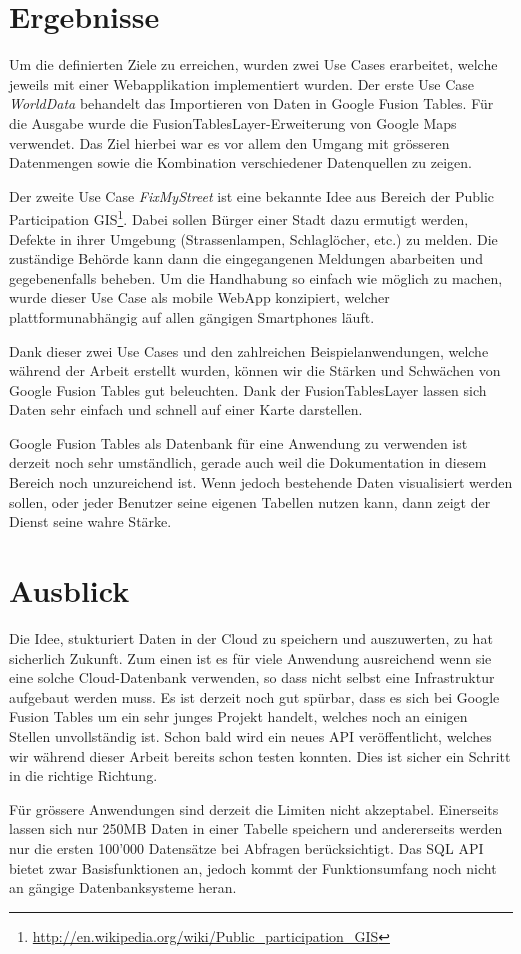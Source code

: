 \section*{Ergebnisse}
Um die definierten Ziele zu erreichen, wurden zwei Use Cases erarbeitet, welche jeweils mit einer Webapplikation implementiert wurden. Der erste Use Case \emph{WorldData} behandelt das Importieren von Daten in Google Fusion Tables. Für die Ausgabe wurde die FusionTablesLayer-Erweiterung von Google Maps verwendet. Das Ziel hierbei war es vor allem den Umgang mit grösseren Datenmengen sowie  die Kombination verschiedener Datenquellen zu zeigen.

Der zweite Use Case \emph{FixMyStreet} ist eine bekannte Idee aus Bereich der Public Participation \gls{GIS}\footnote{\url{http://en.wikipedia.org/wiki/Public_participation_GIS}}. Dabei sollen Bürger einer Stadt dazu ermutigt werden, Defekte in ihrer Umgebung (Strassenlampen, Schlaglöcher, etc.) zu melden. Die zuständige Behörde kann dann die eingegangenen Meldungen abarbeiten und gegebenenfalls beheben. Um die Handhabung so einfach wie möglich zu machen, wurde dieser Use Case als mobile WebApp konzipiert, welcher plattformunabhängig auf allen gängigen Smartphones läuft.

Dank dieser zwei Use Cases und den zahlreichen Beispielanwendungen, welche während der Arbeit erstellt wurden, können wir die Stärken und Schwächen von Google Fusion Tables gut beleuchten. Dank der FusionTablesLayer lassen sich Daten sehr einfach und schnell auf einer Karte darstellen.

Google Fusion Tables als Datenbank für eine Anwendung zu verwenden ist derzeit noch sehr umständlich, gerade auch weil die Dokumentation in diesem Bereich noch unzureichend ist. Wenn jedoch bestehende Daten visualisiert werden sollen, oder jeder Benutzer seine eigenen Tabellen nutzen kann, dann zeigt der Dienst seine wahre Stärke.

\section*{Ausblick}
Die Idee, stukturiert Daten in der \gls{Cloud} zu speichern und auszuwerten, zu hat sicherlich Zukunft. Zum einen ist es für viele Anwendung ausreichend wenn sie eine solche \gls{Cloud}-Datenbank verwenden, so dass nicht selbst eine Infrastruktur aufgebaut werden muss. Es ist derzeit noch gut spürbar, dass es sich bei Google Fusion Tables um ein sehr junges Projekt handelt, welches noch an einigen Stellen unvollständig ist. Schon bald wird ein neues API veröffentlicht, welches wir während dieser Arbeit bereits schon testen konnten. Dies ist sicher ein Schritt in die richtige Richtung.

Für grössere Anwendungen sind derzeit die Limiten nicht akzeptabel. Einerseits lassen sich nur 250MB Daten in einer Tabelle speichern und andererseits werden nur die ersten 100'000 Datensätze bei Abfragen berücksichtigt. Das SQL API bietet zwar Basisfunktionen an, jedoch kommt der Funktionsumfang noch nicht an gängige Datenbanksysteme heran.


